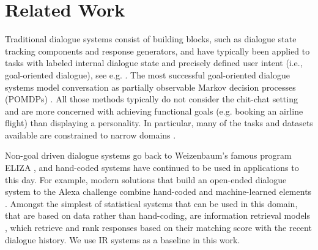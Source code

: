 \documentclass[11pt,a4paper]{article}
\begin{document}
 \section{Related Work}

Traditional dialogue systems consist of building blocks, such as dialogue state tracking components and response generators, and have typically been applied to tasks with labeled internal dialogue state  and precisely defined user intent (i.e., goal-oriented dialogue), see e.g. \citep{young2000probabilistic}. 
The most successful goal-oriented dialogue systems model conversation as partially observable Markov decision processes (POMDPs) \citep{young2013pomdp}.
All those methods typically do not consider the chit-chat setting and are more concerned with achieving functional goals (e.g. booking an airline flight) than displaying a personality.
In particular, many of the tasks and datasets available are constrained to narrow domains \citep{serban2015survey}.

Non-goal driven dialogue systems go back to Weizenbaum's famous program ELIZA 
\citep{weizenbaum1966eliza}, and hand-coded systems have continued to be used in applications 
to this day. For example, modern solutions that build an open-ended dialogue system to the Alexa challenge  combine hand-coded and machine-learned elements \citep{serban2017deep}.
Amongst the simplest of statistical systems that can be used in this domain, that are based on data rather than hand-coding, are information retrieval models \citep{sordoni2015neural}, which retrieve and rank responses based on their matching score with the recent dialogue history.
We use IR systems as a baseline in this work.
\end{document}

